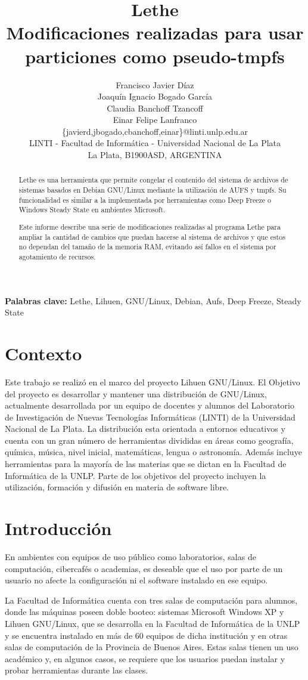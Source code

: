 \documentclass[final,narroweqnarray,inline,twoside]{ieee}
\author{Francisco Javier Díaz \\Joaquín Ignacio Bogado García \\
Claudia Banchoff Tzancoff\\Einar Felipe Lanfranco \\ \{javierd,jbogado,cbanchoff,einar\}@linti.unlp.edu.ar
\\LINTI - Facultad de Informática - Universidad Nacional de La Plata
\\La Plata, B1900ASD, ARGENTINA}
\title{Lethe\\Modificaciones realizadas para usar particiones como pseudo-tmpfs}
\begin{document}
\maketitle
\sloppy

\begin{abstract}
\noindent Lethe es una herramienta que permite congelar el contenido del sistema de archivos de sistemas basados en Debian
GNU/Linux mediante la utilización de AUFS y tmpfs. Su funcionalidad es similar a la implementada por herramientas como Deep
Freeze o Windows Steady State en ambientes Microsoft.

Este informe describe una serie de modificaciones realizadas al programa Lethe para ampliar la cantidad de cambios
que puedan hacerse al sistema de archivos y que estos no dependan del tamaño de la memoria RAM, evitando así fallos en
el sistema por agotamiento de recursos.
\end{abstract}

\noindent \textbf{Palabras clave: } Lethe, Lihuen, GNU/Linux, Debian, Aufs, Deep Freeze, Steady State

\section{Contexto}
Este trabajo se realizó en el marco del proyecto Lihuen GNU/Linux. El Objetivo del proyecto es desarrollar y mantener una
distribución de GNU/Linux, actualmente desarrollada por un equipo de docentes y alumnos del Laboratorio de Investigación de
Nuevas Tecnologías Informáticas (LINTI) de la Universidad Nacional de La Plata. La distribución esta orientada a entornos
educativos y cuenta con un gran número de herramientas divididas en áreas como geografía, química, música, nivel inicial,
matemáticas, lengua o astronomía. Además incluye herramientas para la mayoría de las materias que se dictan en la Facultad
de Informática de la UNLP. Parte de los objetivos del proyecto incluyen la utilización, formación y difusión en materia de
software libre. 

\section{Introducción}
En ambientes con equipos de uso público como laboratorios, salas de computación, cibercafés o academias, es deseable que el
uso por parte de un usuario no afecte la configuración ni el software instalado en ese equipo.

La Facultad de Informática cuenta con tres salas de computación para alumnos, donde las máquinas poseen doble booteo:
sistemas Microsoft Windows XP y Lihuen GNU/Linux, que se desarrolla en la Facultad de Informática de la UNLP y se encuentra
instalado en más de 60 equipos de dicha institución y en otras salas de computación de la Provincia de Buenos Aires. Estas
salas tienen un uso académico y, en algunos casos, se requiere que los usuarios puedan instalar y probar herramientas durante
las clases.
\end{document}
